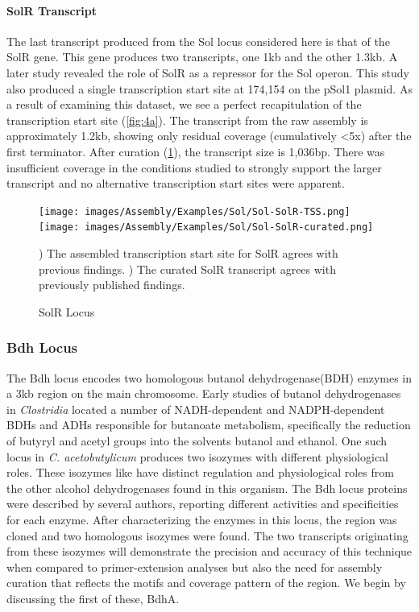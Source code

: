 \paragraph{SolR Transcript}
The last transcript produced from the Sol locus considered here is that of the SolR gene. This gene produces two transcripts, one 1kb and the other 1.3kb\cite{63}. A later study revealed the role of SolR as a repressor for the Sol operon\cite{67}. This study also produced a single transcription start site at 174,154 on the pSol1 plasmid. As a result of examining this dataset, we see a perfect recapitulation of the transcription start site (\ref{fig:4a}). The transcript from the raw assembly is approximately 1.2kb, showing only residual coverage (cumulatively \textless 5x) after the first terminator. After curation (\ref{fig:4b}), the transcript size is 1,036bp. There was insufficient coverage in the conditions studied to strongly support the larger transcript and no alternative transcription start sites were apparent.


\begin{figure}
{\texttt{[image: images/Assembly/Examples/Sol/Sol-SolR-TSS.png]}
\label{fig:4a}}
{\texttt{[image: images/Assembly/Examples/Sol/Sol-SolR-curated.png]}
\label{fig:4b}}
\caption{SolR Locus}
) The assembled transcription start site for SolR agrees with previous findings. ) The curated SolR transcript agrees with previously published findings\cite{63,67}.
\end{figure}

\subsubsection{Bdh Locus}
The Bdh locus encodes two homologous butanol dehydrogenase(BDH) enzymes in a 3kb region on the main chromosome. Early studies of butanol dehydrogenases in \textit{Clostridia} located a number of NADH-dependent and NADPH-dependent BDHs and ADHs responsible for butanoate metabolism\cite{69,70,71,72}, specifically the reduction of butyryl and acetyl groups into the solvents butanol and ethanol. One such locus in \textit{C. acetobutylicum} produces two isozymes with different physiological roles. These isozymes like have distinct regulation and physiological roles from the other alcohol dehydrogenases found in this organism. The Bdh locus proteins were described by several authors, reporting different activities and specificities for each enzyme\cite{69,70}. After characterizing the enzymes in this locus, the region was cloned and two homologous isozymes were found. The two transcripts originating from these isozymes will demonstrate the precision and accuracy of this technique when compared to primer-extension analyses but also the need for assembly curation that reflects the motifs and coverage pattern of the region. We begin by discussing the first of these, BdhA.
